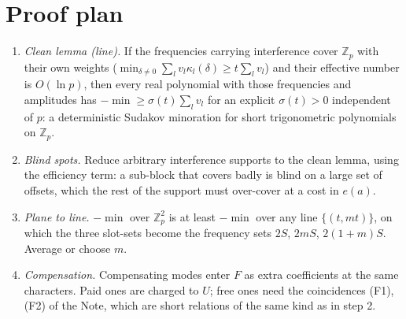 \documentclass[11pt]{article}
\theoremstyle{definition}
\begin{document}
\section{Proof plan}
\begin{enumerate}
\item \emph{Clean lemma (line).}  If the frequencies carrying interference cover $\mathbb Z_p$ with their own weights
($\min_{\delta\ne0}\sum_lv_l\kappa_l(\delta)\ge t\sum_lv_l$) and their effective number is $O(\ln p)$, then every real polynomial with those
frequencies and amplitudes has $-\min\ge\sigma(t)\sum_lv_l$ for an explicit $\sigma(t)>0$ independent of $p$: a deterministic Sudakov
minoration for short trigonometric polynomials on $\mathbb Z_p$.
\item \emph{Blind spots.}  Reduce arbitrary interference supports to the clean lemma, using the efficiency term: a sub-block that covers
badly is blind on a large set of offsets, which the rest of the support must over-cover at a cost in $e(a)$.
\item \emph{Plane to line.}  $-\min$ over $\mathbb Z_p^2$ is at least $-\min$ over any line $\{(t,mt)\}$, on which the three slot-sets become
the frequency sets $2S$, $2mS$, $2(1+m)S$.  Average or choose $m$.
\item \emph{Compensation.}  Compensating modes enter $F$ as extra coefficients at the same characters.  Paid ones are charged to $U$;
free ones need the coincidences (F1), (F2) of the Note, which are short relations of the same kind as in step 2.
\end{enumerate}
\end{document}
